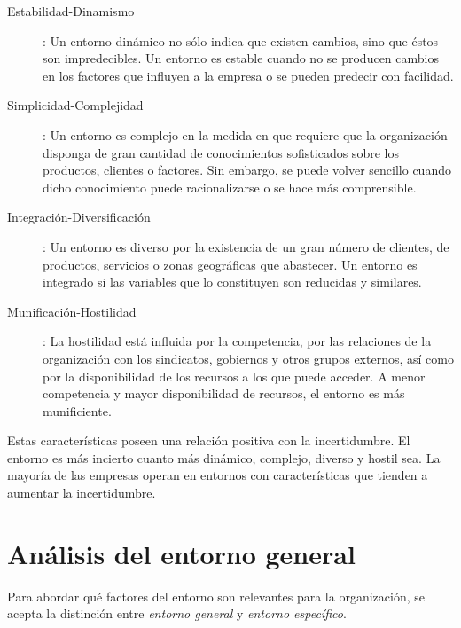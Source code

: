 \documentclass[10pt,a4paper,spanish]{report}
\begin{document}
            \begin{description}
                  \item[Estabilidad-Dinamismo]: Un entorno dinámico no sólo indica que existen cambios, sino que éstos son impredecibles. Un entorno es estable cuando no se producen cambios en los factores que influyen a la empresa o se pueden predecir con facilidad.
                  \item[Simplicidad-Complejidad]: Un entorno es complejo en la medida en que requiere que la organización disponga de gran cantidad de conocimientos sofisticados sobre los productos, clientes o factores. Sin embargo, se puede volver sencillo cuando dicho conocimiento puede racionalizarse o se hace más comprensible.
                  \item[Integración-Diversificación]: Un entorno es diverso por la existencia de un gran número de clientes, de productos, servicios o zonas geográficas que abastecer. Un entorno es integrado si las variables que lo constituyen son reducidas y similares.
                  \item[Munificación-Hostilidad]: La hostilidad está influida por la competencia, por las relaciones de la organización con los sindicatos, gobiernos y otros grupos externos, así como por la disponibilidad de los recursos a los que puede acceder. A menor competencia y mayor disponibilidad de recursos, el entorno es más munificiente.
            \end{description}

            Estas características poseen una relación positiva con la incertidumbre. El entorno es más incierto cuanto más dinámico, complejo, diverso y hostil sea. La mayoría de las empresas operan en entornos con características que tienden a aumentar la incertidumbre.

    \section{\textcolor[rgb]{0.3,0.4,0.6}Análisis del entorno general}

        Para abordar qué factores del entorno son relevantes para la organización, se acepta la distinción entre \textit{\textcolor[rgb]{0.3,0.4,0.6}{entorno general}} y \textit{\textcolor[rgb]{0.3,0.4,0.6}{entorno específico}}.
\end{document}
